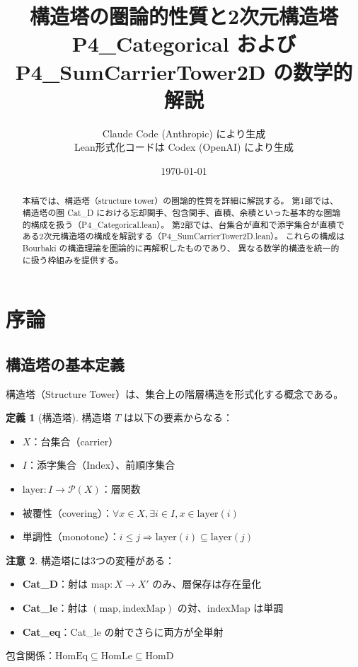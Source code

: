 \documentclass[a4paper,11pt]{ltjsarticle}
\title{構造塔の圏論的性質と2次元構造塔\\
  \Large P4\_Categorical および P4\_SumCarrierTower2D の数学的解説}
\author{Claude Code (Anthropic) により生成 \\
  \small Lean形式化コードは Codex (OpenAI) により生成}
\date{\today}
\theoremstyle{definition}
\newtheorem{definition}{定義}[section]
\newtheorem{remark}[definition]{注意}
\begin{document}
\maketitle

\begin{abstract}
本稿では、構造塔（structure tower）の圏論的性質を詳細に解説する。
第1部では、構造塔の圏 Cat\_D における忘却関手、包含関手、直積、余積といった基本的な圏論的構成を扱う（P4\_Categorical.lean）。
第2部では、台集合が直和で添字集合が直積である2次元構造塔の構成を解説する（P4\_SumCarrierTower2D.lean）。
これらの構成は Bourbaki の構造理論を圏論的に再解釈したものであり、
異なる数学的構造を統一的に扱う枠組みを提供する。
\end{abstract}

\tableofcontents

\section{序論}

\subsection{構造塔の基本定義}

構造塔（Structure Tower）は、集合上の階層構造を形式化する概念である。

\begin{definition}[構造塔]
構造塔 $T$ は以下の要素からなる：
\begin{itemize}
  \item $X$：台集合（carrier）
  \item $I$：添字集合（Index）、前順序集合
  \item $\mathrm{layer} : I \to \mathcal{P}(X)$：層関数
  \item 被覆性（covering）：$\forall x \in X, \exists i \in I, x \in \mathrm{layer}(i)$
  \item 単調性（monotone）：$i \leq j \Rightarrow \mathrm{layer}(i) \subseteq \mathrm{layer}(j)$
\end{itemize}
\end{definition}

\begin{remark}
構造塔には3つの変種がある：
\begin{itemize}
  \item \textbf{Cat\_D}：射は $\mathrm{map}: X \to X'$ のみ、層保存は存在量化
  \item \textbf{Cat\_le}：射は $(\mathrm{map}, \mathrm{indexMap})$ の対、$\mathrm{indexMap}$ は単調
  \item \textbf{Cat\_eq}：Cat\_le の射でさらに両方が全単射
\end{itemize}
包含関係：$\mathrm{HomEq} \subseteq \mathrm{HomLe} \subseteq \mathrm{HomD}$
\end{remark}
\end{document}

